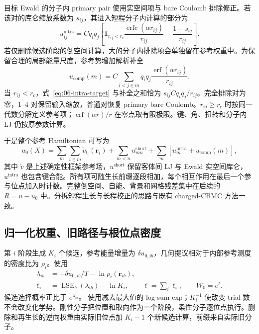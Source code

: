 目标 Ewald 的分子内 primary pair 使用实空间项与 bare Coulomb 排除修正。若该对的库仑缩放系数为 $s_{ij}$，其进入短程分子内计算的部分为
\begin{equation}
u_{ij}^{\mathrm{intra}}
=Cq_iq_j\left[
\mathbf1_{r_{ij}<r_c}\frac{\operatorname{erfc}(\alpha r_{ij})}{r_{ij}}
-\frac{1-s_{ij}}{r_{ij}}\right].
\label{eq:06-intra-target}
\end{equation}
若仅删除候选阶段的倒空间计算，大的分子内排除项会单独留在参考权重中。为保留合理的局部能量尺度，参考势增加解析补全
\begin{equation}
u_{\mathrm{comp}}(m)
=C\sum_{i<j\in m}q_iq_j\frac{\operatorname{erf}(\alpha r_{ij})}{r_{ij}}.
\label{eq:06-intra-completion}
\end{equation}
当 $r_{ij}<r_c$，式~\eqref{eq:06-intra-target} 与补全之和恰为 $s_{ij}Cq_iq_j/r_{ij}$。完全排除对为零，1--4 对保留输入缩放，普通对恢复 primary bare Coulomb。$r_{ij}\ge r_c$ 时按同一代数分解定义参考项；$\operatorname{erf}(\alpha r)/r$ 在零点取有限极限。键、角、扭转和分子内 LJ 仍按原参数计算。

于是整个参考 Hamiltonian 可写为
\begin{equation}
u_0(X)
=\sum_{m}\sum_{i\in m}\widetilde v_{t_i}(\mathbf r_i)
+\sum_{m<n}u_{mn}^{\mathrm{short}}
+\sum_m\left[u_m^{\mathrm{intra}}+u_{\mathrm{comp}}(m)\right],
\label{eq:06-reference-energy}
\end{equation}
其中 $\widetilde v$ 是上述确定性框架参考场，$u^{\mathrm{short}}$ 保留客体间 LJ 与 Ewald 实空间库仑，$u^{\mathrm{intra}}$ 也包含键合能。所有项可随生长前缀逐段相加，每个相互作用在最后一个参与位点加入时计数。完整倒空间、自能、背景和网格残差集中在后续的 $R=u-u_0$ 中。分拆短程生长与长程校正的思路与既有 charged-CBMC 方法一致\cite{dubbeldam2013}。

\subsection{归一化权重、旧路径与根位点密度}

第 $i$ 阶段生成 $K_i$ 个候选，参考能量增量为 $\delta u_{0,ib}$，几何提议相对于内部参考测度的密度比为 $\rho_i$。使用
\begin{align}
\lambda_{ib}&=-\delta u_{0,ib}/T-\ln\rho_i(\mathbf r_{ib}),\nonumber\\
\ell_i&=\operatorname{LSE}_b(\lambda_{ib})-\ln K_i,
\qquad \ell=\sum_i\ell_i,\qquad W_0=e^\ell.
\label{eq:06-logmean}
\end{align}
候选选择概率正比于 $e^{\lambda_{ib}}$。 使用减去最大值的 log-sum-exp；$K_i^{-1}$ 使改变 trial 数不会改变化学势。刚性分子把位置和取向作为一个阶段，柔性分子逐位点执行。删除和再生长的逆向权重由实际旧位点加 $K_i-1$ 个新候选计算，前缀来自实际旧分子。

